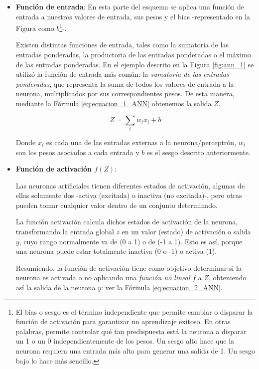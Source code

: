\documentclass[12pt,a4paper]{article}
\begin{document}
\begin{sloppypar}
\begin{itemize}
\item \textbf{Función de entrada}: En esta parte del esquema se aplica una función de entrada a nuestros valores de entrada, sus pesos y el bías -representado en la Figura como $b$\footnote{El bias o sesgo es el término independiente que permite cambiar o disparar la función de activación para garantizar un aprendizaje exitoso. En otras palabras, permite controlar qué tan predispuesta está la neurona a disparar un 1 o un 0 independientemente de los pesos. Un sesgo alto hace que la neurona requiera una entrada más alta para generar una salida de 1. Un sesgo bajo lo hace más sencillo.}-.

Existen distintas funciones de entrada, tales como la sumatoria de las entradas ponderadas, la productoria de las entradas ponderadas o el máximo de las entradas ponderadas\cite{ANN_23}. En el ejemplo descrito en la Figura \ref{fig:ann_1} se utilizó la función de entrada más común: la \textit{sumatoria de las entradas ponderadas}, que representa la suma de todos los valores de entrada a la neurona, multiplicados por sus correspondientes pesos. De esta manera, mediante la Fórmula \ref{eq:ecuacion_1_ANN} obtenemos la salida $Z$.

\begin{equation}\label{eq:ecuacion_1_ANN}
Z=\sum_{i}w_{i}x_{i}+b
\end{equation}

Donde $x_i$ es cada una de las entradas externas a la neurona/perceptrón, $w_i$ son los pesos asociados a cada entrada y $b$ es el sesgo descrito anteriormente. 

\item \textbf{Función de activación $f(Z)$}:

Las neuronas artificiales tienen diferentes estados de activación, algunas de ellas solamente dos -activa (excitada) o inactiva (no excitada)-, pero otras pueden tomar cualquier valor dentro de un conjunto determinado.

La función activación calcula dichos estados de activación de la neurona, transformando la entrada global $z$ en un valor (estado) de activación o salida $y$, cuyo rango normalmente va de (0 a 1) o de (-1 a 1). Esto es así, porque una neurona puede estar totalmente inactiva (0 o -1) o activa (1)\cite{ANN_23}. 

Resumiendo, la función de activación tiene como objetivo determinar si la neurona es activada o no aplicando una \textit{función no lineal} $f$ a $Z$, obteniendo así la salida de la neurona $y$: ver la Fórmula \ref{eq:ecuacion_2_ANN}. 


\end{itemize}
\end{sloppypar}
\end{document}
